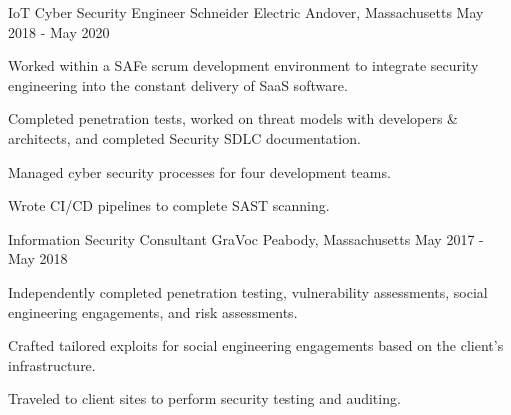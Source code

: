 \begin{cventries}
  \cventry
    {IoT Cyber Security Engineer} %
    {Schneider Electric} %
    {Andover, Massachusetts} %
    {May 2018 - May 2020} %
    {
      \begin{cvitems} %
        \item {
          Worked within a SAFe scrum development environment to integrate security engineering into the constant delivery of SaaS software.
        }
        \item {
          Completed penetration tests, worked on threat models with developers \& architects, and completed Security SDLC documentation.
        }
        \item {
          Managed cyber security processes for four development teams.
        }
        \item {
          Wrote CI/CD pipelines to complete SAST scanning.
        }
      \end{cvitems}
    }

  \cventry
    {Information Security Consultant} %
    {GraVoc} %
    {Peabody, Massachusetts} %
    {May 2017 - May 2018} %
    {
      \begin{cvitems} %
        \item {
          Independently completed penetration testing, vulnerability assessments, social engineering engagements, and risk assessments.
        }
        \item {
          Crafted tailored exploits for social engineering engagements based on the client's infrastructure.
        }
        \item {
          Traveled to client sites to perform security testing and auditing.
        }
      \end{cvitems}
    }


\end{cventries}
